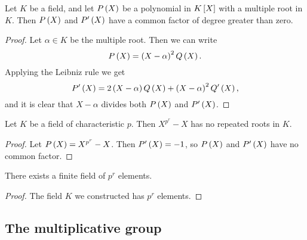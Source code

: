 \begin{lemma}
Let $ K $ be a field, and let $ P\rb{X} $ be a polynomial in $ K\sb{X} $ with a multiple root in $ K $. Then $ P\rb{X} $ and $ P'\rb{X} $ have a common factor of degree greater than zero.
\end{lemma}

\begin{proof}
Let $ \alpha \in K $ be the multiple root. Then we can write
$$ P\rb{X} = \rb{X - \alpha}^2Q\rb{X}. $$
Applying the Leibniz rule we get
$$ P'\rb{X} = 2\rb{X - \alpha}Q\rb{X} + \rb{X - \alpha}^2Q'\rb{X}, $$
and it is clear that $ X - \alpha $ divides both $ P\rb{X} $ and $ P'\rb{X} $.
\end{proof}

\begin{corollary}
Let $ K $ be a field of characteristic $ p $. Then $ X^{p^r} - X $ has no repeated roots in $ K $.
\end{corollary}

\begin{proof}
Let $ P\rb{X} = X^{p^r} - X $. Then $ P'\rb{X} = -1 $, so $ P\rb{X} $ and $ P'\rb{X} $ have no common factor.
\end{proof}

\begin{corollary}
There exists a finite field of $ p^r $ elements.
\end{corollary}

\begin{proof}
The field $ K $ we constructed has $ p^r $ elements.
\end{proof}


\subsection{The multiplicative group}

